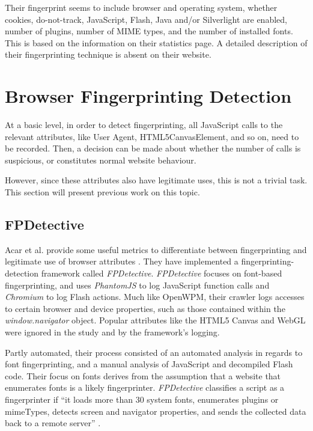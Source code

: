 \documentclass[
    fontsize=12pt,
    headings=small,
    parskip=half,
    bibliography=totoc,
    numbers=noenddot,
    open=any
    ]{scrreprt}
\begin{document}
Their fingerprint seems to include browser and operating system, whether cookies, do-not-track,
JavaScript, Flash, Java and/or Silverlight are enabled, number of plugins, number of MIME types,
and the number of installed fonts. This is based on the information on their statistics page.
A detailed description of their fingerprinting technique is absent on their website.

\section{Browser Fingerprinting Detection}
At a basic level, in order to detect fingerprinting, all JavaScript calls to the relevant attributes,
like User Agent, HTML5CanvasElement, and so on, need to be recorded. Then, a decision can be made about whether the number
of calls is suspicious, or constitutes normal website behaviour.

However, since these attributes also have legitimate uses, this is not a trivial task.
This section will present previous work on this topic.


\subsection{FPDetective}
\label{related_work:fpdetective}
Acar et al. provide some useful metrics to differentiate between fingerprinting and legitimate use of
browser attributes \cite{DBLP:conf/ccs/AcarJNDGPP13}. They have implemented a fingerprinting-detection
framework called \textit{FPDetective}.
\textit{FPDetective} focuses on font-based fingerprinting, and uses
\textit{PhantomJS} to log JavaScript function calls and \textit{Chromium} to log Flash actions.
Much like OpenWPM, their crawler logs accesses to certain browser and device properties, such as
those contained within the \textit{window.navigator} object.
Popular attributes like the HTML5 Canvas and WebGL were ignored in the study and by the framework's logging.

Partly automated, their process consisted of an automated analysis in regards to font fingerprinting,
and a manual analysis of JavaScript and decompiled Flash code.
Their focus on fonts derives from the assumption that a website that
enumerates fonts is a likely fingerprinter.
\textit{FPDetective} classifies a script as a fingerprinter if ``it loads more than 30 system fonts, enumerates plugins
or mimeTypes, detects screen and navigator properties, and sends the collected data back to a remote server''
\cite{DBLP:conf/ccs/AcarJNDGPP13}.
\end{document}

